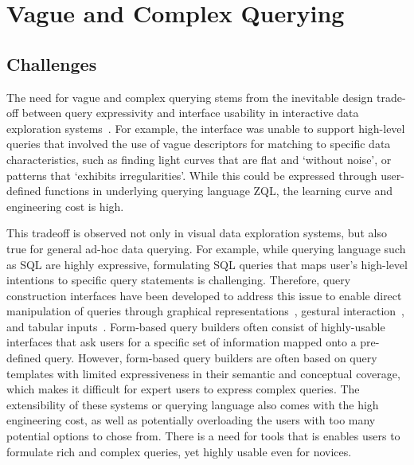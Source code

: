 \section{Vague and Complex Querying\label{sec:vague}}
\subsection{Challenges}
\par The need for vague and complex querying stems from the inevitable design trade-off between query expressivity and interface usability in interactive data exploration systems~\cite{Morton2014,Jagadish2007}. For example, the \zv interface was unable to support high-level queries that involved the use of vague descriptors for matching to specific data characteristics, such as finding light curves that are flat and `without noise', or patterns that `exhibits irregularities'. While this could be expressed through user-defined functions in underlying querying language ZQL, the learning curve and engineering cost is high.
\par This tradeoff is observed not only in visual data exploration systems, but also true for general ad-hoc data querying. For example, while querying language such as SQL are highly expressive, formulating SQL queries that maps user's high-level intentions to specific query statements is challenging. Therefore, query construction interfaces have been developed to address this issue to enable direct manipulation of queries through graphical representations~\cite{Abouzied2012}, gestural interaction~\cite{Nandi2013}, and tabular inputs~\cite{Zloof1975,Embley1989}. Form-based query builders often consist of highly-usable interfaces that ask users for a specific set of information mapped onto a pre-defined query. However, form-based query builders are often based on query templates with limited expressiveness in their semantic and conceptual coverage, which makes it difficult for expert users to express complex queries. The extensibility of these systems or querying language also comes with the high engineering cost, as well as potentially overloading the users with too many potential options to chose from. There is a need for tools that is enables users to formulate rich and complex queries, yet highly usable even for novices.  

